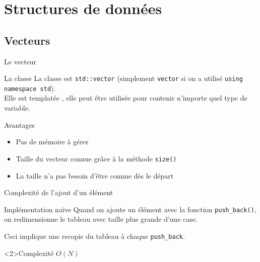 \documentclass{beamer}
\begin{document}
\section{Structures de données}

\subsection{Vecteurs}


\begin{frame}{Le vecteur}
    \begin{block}{La classe}
    La classe est \texttt{std::vector} (simplement \texttt{vector} si on a utilisé \texttt{using namespace std}).\\
    Elle est \og templatée \fg, elle peut être utilisée pour contenir n'importe quel type de variable.
  \end{block}

\begin{exampleblock}{Avantages}
  \begin{itemize}
  \item Pas de mémoire à gérer
  \item Taille du vecteur connue grâce à la méthode \texttt{size()}
  \item La taille n'a pas besoin d'être connue dès le départ
  \end{itemize}
\end{exampleblock}
\end{frame}

\begin{frame}{Complexité de l'ajout d'un élément}

\begin{block}{Implémentation naïve}
    Quand on ajoute un élément avec la fonction \texttt{push_back()}, on redimensionne le tableau avec taille plus grande d'une case.
\end{block}

Ceci implique une recopie du tableau à chaque \texttt{push_back}.

\begin{exampleblock}<2>{Complexité}
    \centering
    $O(N)$
\end{exampleblock}
\end{frame}
\end{document}
